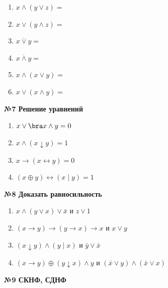     \begin{enumerate}
        \item $x \wedge (y \vee z) = $
        \item $x \vee (y \wedge z) = $
        \item $\overline{x \vee y} = $
        \item $\overline{x \wedge y} = $
        \item $x \wedge (x \vee y) = $
        \item $x \vee (x \wedge y) = $
    \end{enumerate}

    \begin{center}
        \textbf{№7 Решение уравнений}
    \end{center}

    \begin{enumerate}
        \item $x \vee \bra x \wedge y = 0$
        \item $x \wedge (x \downarrow y) = 1$
        \item $x \rightarrow (x \leftrightarrow y) = 0$
        \item $(x \oplus y) \leftrightarrow (x \mid y) = 1$
    \end{enumerate}

    \begin{center}
        \textbf{№8 Доказать равносильность}
    \end{center}

    \begin{enumerate}
        \item $x \wedge (y \vee x) \vee \bar x$ и $z \vee 1$
        \item $(x \rightarrow y) \rightarrow (y \rightarrow x) \rightarrow x$ и $x \vee y$
        \item $(x \downarrow y) \wedge (y \mid x)$ и $\bar y \vee \bar x$
        \item $(x \rightarrow y) \oplus (y \downarrow x) \wedge y$ и $(\bar x \vee y) \wedge (\bar x \vee x)$
    \end{enumerate}

    \begin{center}
        \textbf{№9 СКНФ, СДНФ}
    \end{center}

